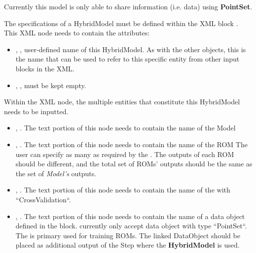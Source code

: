 Currently this model is only able to share information (i.e. data) using \textbf{PointSet}.

The specifications of a HybridModel must be defined within the XML block
.
%
This XML node needs to contain the attributes:

\vspace{-5mm}
\begin{itemize}
  \itemsep0em
  \item {}, , user-defined name
  of this HybridModel.
  \nb As with the other objects, this is the name that can be used to refer to
  this specific entity from other input blocks in the XML.
  \item {}, , must be kept
  empty.
\end{itemize}
\vspace{-5mm}

Within the  XML node, the multiple entities that constitute
this HybridModel needs to be inputted.

\begin{itemize}
  \item {}, .
  The text portion of this node needs to contain the name of the Model
  \item {}, .
  The text portion of this node needs to contain the name of the ROM
  The user can specify as many  as required by the .
  \nb The outputs of each ROM should be different, and the total set of ROMs' outputs
  should be the same as the set of \textit{Model's} outputs.
  \item {}, .
    The text portion of this node needs to contain the name of the  with 
    ``CrossValidation``.
  \item {}, .
    The text portion of this node needs to contain the name of a data object defined in the  block.
    \nb currently only accept data object with type ``PointSet``. The  is primary used for
    training ROMs. \nb The linked DataObject should be placed as additional output of the Step where the
    \textbf{HybridModel} is used.
\end{itemize}

